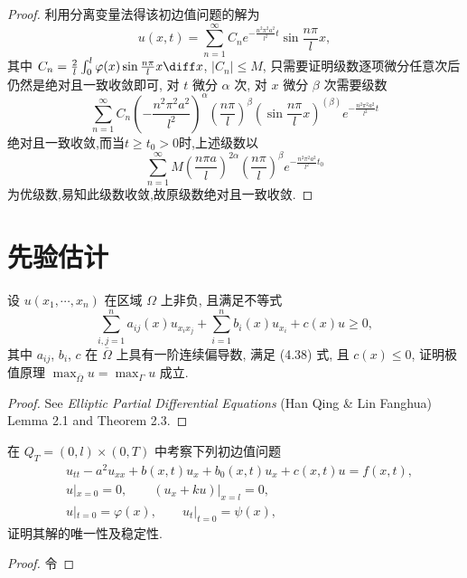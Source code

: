 \begin{proof}
  利用分离变量法得该初边值问题的解为
  \[u(x,t) = \sum_{n=1}^{\infty}C_ne^{-\frac{n^2\pi^2a^2}{l^2}t}\sin\frac{n\pi}{l}x,\]
  其中 $C_n=\frac{2}{l}\int_0^l\varphi(x)\sin\frac{n\pi}{l}x\diff x$,
  $|C_n|\leq M$, 只需要证明级数逐项微分任意次后仍然是绝对且一致收敛即可,
  对 $t$ 微分 $\alpha$ 次, 对 $x$ 微分 $\beta$ 次需要级数
  \[\sum_{n=1}^{\infty}C_n\left(-\frac{n^2\pi^2a^2}{l^2}\right)^{\alpha}\left(\frac{n\pi}{l}\right)^{\beta}\left(\sin\frac{n\pi}{l}x\right)^{(\beta)}e^{-\frac{n^2\pi^2a^2}{l^2}t}\]
  绝对且一致收敛,而当$t\geq t_0>0$时,上述级数以
  \[\sum_{n=1}^{\infty}M\left(\frac{n\pi a}{l}\right)^{2\alpha}\left(\frac{n\pi}{l}\right)^{\beta}e^{-\frac{n^2\pi^2a^2}{l^2}t_0}\]
  为优级数,易知此级数收敛,故原级数绝对且一致收敛.
\end{proof}


\section{先验估计}

\begin{exercise}
  设 $u(x_1,\cdots,x_n)$ 在区域 $\Omega$ 上非负, 且满足不等式
  \[\sum_{i,j=1}^n a_{ij}(x) u_{x_ix_j} + \sum_{i=1}^n b_i(x) u_{x_i} + c(x)u\geq 0,\]
  其中 $a_{ij}$, $b_i$, $c$ 在 $\overline{\Omega}$ 上具有一阶连续偏导数,
  满足 (4.38) 式, 且 $c(x)\leq 0$,
  证明极值原理 $\max_{\overline{\Omega}}u=\max_{\Gamma}u$ 成立.
\end{exercise}

\begin{proof}
  See \emph{Elliptic Partial Differential Equations} (Han Qing \& Lin Fanghua) 
  Lemma 2.1 and Theorem 2.3.
\end{proof}


\begin{exercise}[3]
  在 $Q_T = (0,l)\times (0,T)$ 中考察下列初边值问题
  \begin{align*}
    & u_{tt} - a^2 u_{xx} + b(x,t)u_x + b_0(x,t)u_x + c(x,t)u = f(x,t), \\
    & u|_{x=0} = 0,\qquad (u_x + ku)|_{x=l} = 0, \\
    & u|_{t=0} = \varphi(x), \qquad u_t|_{t=0} = \psi(x),
  \end{align*}
  证明其解的唯一性及稳定性.
\end{exercise}

\begin{proof}
  令
\end{proof}



